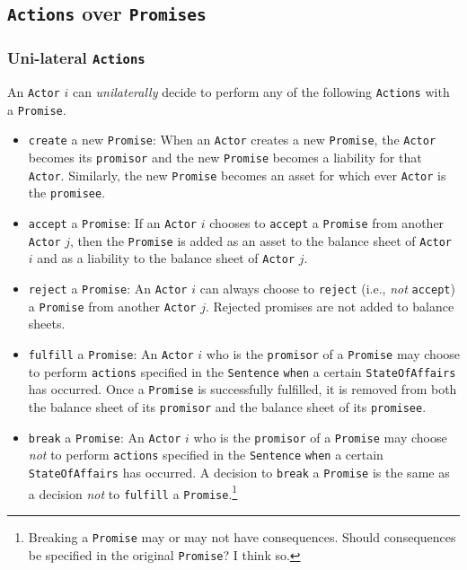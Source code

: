 \documentclass[a4paper]{article}
\begin{document}
\subsection{\texttt{Actions} over \texttt{Promises}}

\subsubsection{Uni-lateral \texttt{Actions}}
An \texttt{Actor} $i$ can \textit{unilaterally} decide to perform any of the following \texttt{Actions} with a \texttt{Promise}. 
\begin{itemize}
	\item \texttt{create} a new \texttt{Promise}: When an \texttt{Actor} creates a new \texttt{Promise}, the \texttt{Actor} becomes its \texttt{promisor} and the new \texttt{Promise} becomes a liability for that \texttt{Actor}. Similarly, the new \texttt{Promise} becomes an asset for which ever \texttt{Actor} is the \texttt{promisee}.
	\item \texttt{accept} a \texttt{Promise}: If an \texttt{Actor} $i$ chooses to \texttt{accept} a \texttt{Promise} from another \texttt{Actor} $j$, then the \texttt{Promise} is added as an asset to the balance sheet of \texttt{Actor} $i$ and as a liability to the balance sheet of \texttt{Actor} $j$.
	\item \texttt{reject} a \texttt{Promise}: An \texttt{Actor} $i$ can always choose to \texttt{reject} (i.e., \textit{not} \texttt{accept}) a \texttt{Promise} from another \texttt{Actor} $j$. Rejected promises are not added to balance sheets.
	\item \texttt{fulfill} a \texttt{Promise}: An \texttt{Actor} $i$ who is the \texttt{promisor} of a \texttt{Promise} may choose to perform \texttt{actions} specified in the \texttt{Sentence} \texttt{when} a certain \texttt{StateOfAffairs} has occurred. Once a \texttt{Promise} is successfully fulfilled, it is removed from both the balance sheet of its \texttt{promisor} and the balance sheet of its \texttt{promisee}.
	\item \texttt{break} a \texttt{Promise}: An \texttt{Actor} $i$ who is the \texttt{promisor} of a \texttt{Promise} may choose \textit{not} to perform \texttt{actions} specified in the \texttt{Sentence} \texttt{when} a certain \texttt{StateOfAffairs} has occurred. A decision to \texttt{break} a \texttt{Promise} is the same as a decision \textit{not} to \texttt{fulfill} a \texttt{Promise}.\footnote{
	Breaking a \texttt{Promise} may or may not have consequences. Should consequences be specified in the original \texttt{Promise}? I think so.
}
\end{itemize}
\end{document}
